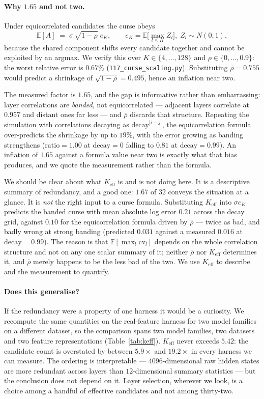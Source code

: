 \documentclass{article}
\begin{document}
\paragraph{Why $1.65$ and not two.} Under equicorrelated candidates the curse
obeys
\[
  \mathbb{E}[A] \;=\; \sigma\,\sqrt{1-\rho}\;e_K ,
  \qquad e_K=\mathbb{E}\big[\max_{l\le K} Z_l\big],\; Z_l\sim N(0,1),
\]
because the shared component shifts every candidate together and cannot be
exploited by an argmax. We verify this over $K\in\{4,\dots,128\}$ and
$\rho\in\{0,\dots,0.9\}$: the worst relative error is $0.67\%$
(\texttt{117\_curse\_scaling.py}). Substituting $\bar\rho=0.755$ would predict
a shrinkage of $\sqrt{1-\bar\rho}=0.495$, hence an inflation near two.

The measured factor is $1.65$, and the gap is informative rather than
embarrassing: layer correlations are \emph{banded}, not equicorrelated
--- adjacent layers correlate at $0.957$ and distant ones far less --- and
$\bar\rho$ discards that structure. Repeating the simulation with correlations
decaying as $\text{decay}^{|i-j|}$, the equicorrelation formula over-predicts
the shrinkage by up to $19\%$, with the error growing as banding strengthens
($\text{ratio}=1.00$ at $\text{decay}=0$ falling to $0.81$ at
$\text{decay}=0.99$). An inflation of $1.65$ against a formula value near two
is exactly what that bias produces, and we quote the measurement rather than
the formula.

We should be clear about what $K_{\text{eff}}$ is and is not doing here. It is
a descriptive summary of redundancy, and a good one: $1.67$ of $32$ conveys
the situation at a glance. It is \emph{not} the right input to a curse
formula. Substituting $K_{\text{eff}}$ into $\sigma e_K$ predicts the banded
curse with mean absolute log error $0.21$ across the decay grid, against
$0.10$ for the equicorrelation formula driven by $\bar\rho$ --- twice as bad,
and badly wrong at strong banding (predicted $0.031$ against a measured
$0.016$ at $\text{decay}=0.99$). The reason is that
$\mathbb{E}[\max_l \text{cv}_l]$ depends on the whole correlation structure
and not on any one scalar summary of it; neither $\bar\rho$ nor
$K_{\text{eff}}$ determines it, and $\bar\rho$ merely happens to be the less
bad of the two. We use $K_{\text{eff}}$ to describe and the measurement to
quantify.

\paragraph{Does this generalise?} If the redundancy were a property of one
harness it would be a curiosity. We recompute the same quantities on the
real-feature harness for two model families on a different dataset, so the
comparison spans two model families, two datasets and two feature
representations (Table~\ref{tab:keff}). $K_{\text{eff}}$ never exceeds
$5.42$: the candidate count is overstated by between $5.9\times$ and
$19.2\times$ in every harness we can measure. The ordering is interpretable
--- $4096$-dimensional raw hidden states are more redundant across layers than
$12$-dimensional summary statistics --- but the conclusion does not depend on
it. Layer selection, wherever we look, is a choice among a handful of
effective candidates and not among thirty-two.
\end{document}
